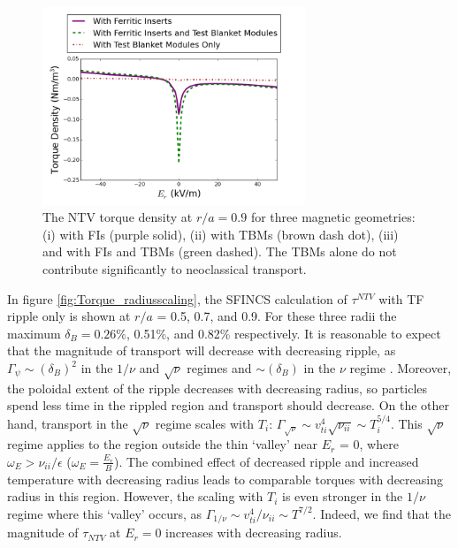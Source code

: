 \documentclass{article}
\numberwithin{figure}{section}
\numberwithin{equation}{section}
\begin{document}
\begin{figure}[h!]
\centering
\includegraphics[width=0.7\textwidth]{Torque_comparingTBMandFI.png}
\caption{\label{fig:Torque_comparingTBMandFI} The NTV torque density at $r/a = 0.9$ for three magnetic geometries: (i) with FIs (purple solid), (ii) with TBMs (brown dash dot), (iii) and with FIs and TBMs (green dashed). The TBMs alone do not contribute significantly to neoclassical transport. }
\end{figure}

In figure \ref{fig:Torque_radiusscaling}, the SFINCS calculation of $\tau^{NTV}$ with TF ripple only is shown at $r/a$ = 0.5, 0.7, and 0.9. For these three radii the maximum $\delta_B = 0.26\%$, 0.51\%, and 0.82\% respectively. It is reasonable to expect that the magnitude of transport will decrease with decreasing ripple, as $\Gamma_{\psi} \sim (\delta_B)^2$ in the $1/\nu$ and $\sqrt{\nu}$ regimes and $\sim (\delta_B)$ in the $\nu$ regime \cite{Shaing2010}.  Moreover, the poloidal extent of the ripple decreases with decreasing radius, so particles spend less time in the rippled region and transport should decrease. On the other hand, transport in the $\sqrt{\nu}$ regime scales with $T_i$: $\Gamma_{\sqrt{\nu}} \sim v_{ti}^4 \sqrt{\nu_{ii}} \sim T_i^{5/4}$. This $\sqrt{\nu}$ regime applies to the region outside the thin `valley' near $E_r$ = 0, where $\omega_E > \nu_{ii}/\epsilon$ ($\omega_E = \frac{E_r}{B}$). The combined effect of decreased ripple and increased temperature with decreasing radius leads to comparable torques with decreasing radius in this region. However, the scaling with $T_i$ is even stronger in the $1/\nu$ regime where this `valley' occurs, as $\Gamma_{1/\nu} \sim v_{ti}^4/\nu_{ii} \sim T^{7/2}$. Indeed, we find that the magnitude of $\tau_{NTV}$ at $E_r = 0$ increases with decreasing radius. 
\end{document}
